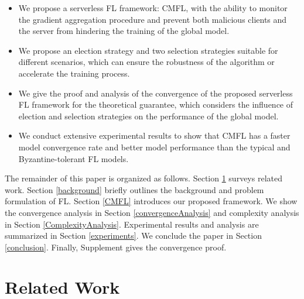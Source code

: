 \documentclass[10pt,journal,compsoc]{IEEEtran}
\begin{document}
\begin{itemize}
	\item We propose a serverless FL framework: CMFL, with the ability to monitor the gradient aggregation procedure and prevent both malicious clients and the server from hindering the training of the global model. 
  \item We propose an election strategy and two selection strategies suitable for different scenarios, which can ensure the robustness of the algorithm or accelerate the training process.
	\item We give the proof and analysis of the convergence of the proposed serverless FL framework for the theoretical guarantee, which considers the influence of election and selection strategies on the performance of the global model. 
	\item We conduct extensive experimental results to show that CMFL has a faster model convergence rate and better model performance than the typical and Byzantine-tolerant FL models.
\end{itemize}

The remainder of this paper is organized as follows. Section \ref{relatedWork} surveys related work. Section \ref{background} briefly outlines the background and problem formulation of FL. Section \ref{CMFL} introduces our proposed framework. We show the convergence analysis in Section \ref{convergenceAnalysis} and complexity analysis in Section \ref{ComplexityAnalysis}. Experimental results and analysis are summarized in Section \ref{experiments}. We conclude the paper in Section \ref{conclusion}. Finally, Supplement gives the convergence proof.





\section{Related Work}
\label{relatedWork}
\end{document}
